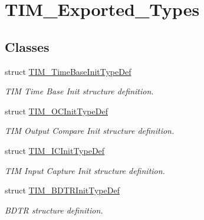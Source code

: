 \hypertarget{group__TIM__Exported__Types}{
\section{TIM\_\-Exported\_\-Types}
\label{group__TIM__Exported__Types}
}
\subsection*{Classes}
\begin{DoxyCompactItemize}
\item 
struct \hyperlink{structTIM__TimeBaseInitTypeDef}{TIM\_\-TimeBaseInitTypeDef}
\begin{DoxyCompactList}\small\item\em TIM Time Base Init structure definition. \item\end{DoxyCompactList}\item 
struct \hyperlink{structTIM__OCInitTypeDef}{TIM\_\-OCInitTypeDef}
\begin{DoxyCompactList}\small\item\em TIM Output Compare Init structure definition. \item\end{DoxyCompactList}\item 
struct \hyperlink{structTIM__ICInitTypeDef}{TIM\_\-ICInitTypeDef}
\begin{DoxyCompactList}\small\item\em TIM Input Capture Init structure definition. \item\end{DoxyCompactList}\item 
struct \hyperlink{structTIM__BDTRInitTypeDef}{TIM\_\-BDTRInitTypeDef}
\begin{DoxyCompactList}\small\item\em BDTR structure definition. \item\end{DoxyCompactList}\end{DoxyCompactItemize}
